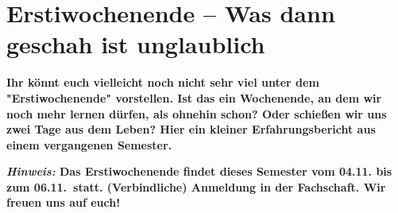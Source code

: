 \section{Erstiwochenende -- Was dann geschah ist unglaublich}
\textbf{Ihr könnt euch vielleicht noch nicht sehr viel unter dem "Erstiwochenende" vorstellen.
	Ist das ein Wochenende, an dem wir noch mehr lernen dürfen, als ohnehin schon?
	Oder schießen wir uns zwei Tage aus dem Leben?
	Hier ein kleiner Erfahrungsbericht aus einem vergangenen Semester.}

\textbf{\emph{Hinweis:}
Das Erstiwochenende findet dieses Semester vom 04.11. bis zum 06.11.\ statt. (Verbindliche) Anmeldung in der Fachschaft. Wir freuen uns auf euch!
}
